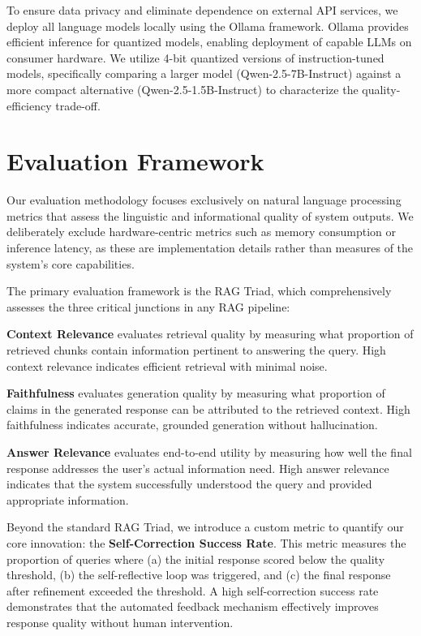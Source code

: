 \documentclass[11pt,a4paper]{article}
\begin{document}
To ensure data privacy and eliminate dependence on external API services, we deploy all language models locally using the Ollama framework. Ollama provides efficient inference for quantized models, enabling deployment of capable LLMs on consumer hardware. We utilize 4-bit quantized versions of instruction-tuned models, specifically comparing a larger model (Qwen-2.5-7B-Instruct) against a more compact alternative (Qwen-2.5-1.5B-Instruct) to characterize the quality-efficiency trade-off.

\section{Evaluation Framework}

Our evaluation methodology focuses exclusively on natural language processing metrics that assess the linguistic and informational quality of system outputs. We deliberately exclude hardware-centric metrics such as memory consumption or inference latency, as these are implementation details rather than measures of the system's core capabilities.

The primary evaluation framework is the RAG Triad, which comprehensively assesses the three critical junctions in any RAG pipeline:

\textbf{Context Relevance} evaluates retrieval quality by measuring what proportion of retrieved chunks contain information pertinent to answering the query. High context relevance indicates efficient retrieval with minimal noise.

\textbf{Faithfulness} evaluates generation quality by measuring what proportion of claims in the generated response can be attributed to the retrieved context. High faithfulness indicates accurate, grounded generation without hallucination.

\textbf{Answer Relevance} evaluates end-to-end utility by measuring how well the final response addresses the user's actual information need. High answer relevance indicates that the system successfully understood the query and provided appropriate information.

Beyond the standard RAG Triad, we introduce a custom metric to quantify our core innovation: the \textbf{Self-Correction Success Rate}. This metric measures the proportion of queries where (a) the initial response scored below the quality threshold, (b) the self-reflective loop was triggered, and (c) the final response after refinement exceeded the threshold. A high self-correction success rate demonstrates that the automated feedback mechanism effectively improves response quality without human intervention.
\end{document}
